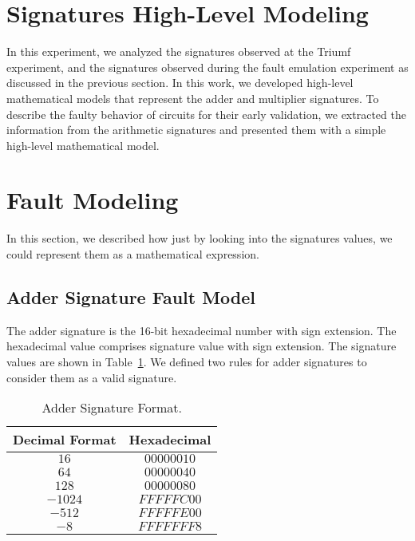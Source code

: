 \section{
Signatures High-Level Modeling}
In this experiment, we analyzed the signatures observed at the Triumf experiment, and the signatures observed during the fault emulation experiment as discussed in the previous section.
In this work, we developed high-level mathematical models that represent the adder and multiplier signatures. To describe the faulty behavior of circuits for their early validation, we extracted the information from the arithmetic signatures and presented them with a simple high-level mathematical model.
\section{Fault Modeling}
In this section, we described how just by looking into the signatures values, we could represent them as a mathematical expression.

\subsection{Adder Signature Fault Model}
The adder signature is the 16-bit hexadecimal number with sign extension. The hexadecimal value comprises signature value with sign extension. The signature values are shown in Table~\ref{adder signature format}. We defined two rules for adder signatures to consider them as a valid signature.
\begin{table}[tb!]
\center
\caption{Adder Signature Format.}
\label{adder signature format}
\begin{tabular}{|c | c |} 
 \hline
Decimal Format & Hexadecimal   \\ 
\hline
 
 
 $16$& $00000010$    \\
 \hline
 $64$ & $00000040$  \\ 
 \hline
 
 $128$ & $00000080$  \\
 \hline
 $-1024$ & $FFFFFC00$ \\
 \hline
 $-512$ & $FFFFFE00$ \\
 \hline
 $-8$ & $FFFFFFF8$   \\
 \hline
 
 
\end{tabular}
\end{table}


